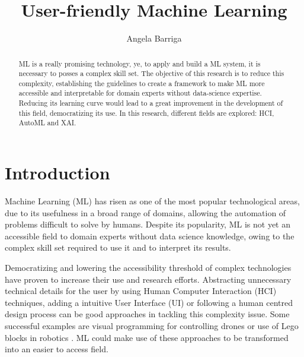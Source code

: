 \documentclass[runningheads]{llncs}
\begin{document}
%
\title{User-friendly Machine Learning}
%
%
\author{Angela Barriga}
%
%
%
\maketitle              %
%
\begin{abstract}
ML is a really promising technology, ye, to apply and build a ML system, it is necessary to posses a complex skill set. The objective of this research is to reduce this complexity, establishing the guidelines to create a framework to make ML more accessible and interpretable for domain experts without data-science expertise. Reducing its learning curve would lead to a great improvement in the development of this field, democratizing its use. In this research, different fields are explored: HCI, AutoML and XAI.
\end{abstract}
%
%
%
\section{Introduction}\label{intro}

Machine Learning (ML) has risen as one of the most popular technological areas, due to its usefulness in a broad range of domains, allowing the automation of problems difficult to solve by humans. Despite its popularity, ML is not yet an accessible field to domain experts without data science knowledge, owing to the complex skill set required to use it and to interpret its results.  

Democratizing and lowering the accessibility threshold of complex technologies have proven to increase their use and research efforts. Abstracting unnecessary technical details for the user by using Human Computer Interaction (HCI) techniques, adding a intuitive User Interface (UI) or following a human centred design process can be good approaches in tackling this complexity issue. Some successful examples are visual programming for controlling drones \cite{1} or use of Lego blocks in robotics \cite{2}. ML could make use of these approaches to be transformed into an easier to access field. 
\end{document}
